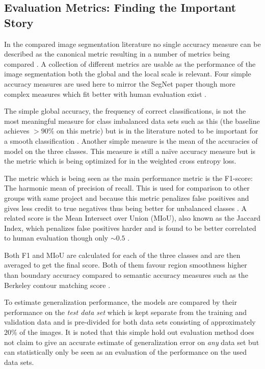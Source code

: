 \documentclass{article}
\begin{document}
\subsection{Evaluation Metrics: Finding the Important Story}
In the compared image segmentation literature no single accuracy measure can be described  as the canonical metric resulting in a number of metrics being compared \cite{eval, Metric}.  A collection of different metrics are usable as the performance of the image segmentation both the global and the local scale is relevant. 
Four simple accuracy measures are used here to mirror the SegNet paper \cite{seg} though more complex measures which fit better with human evaluation exist \cite{eval}. 

The simple global accuracy, the frequency of correct classifications, is not the most meaningful measure for class imbalanced data sets such as this (the baseline achieves \(>90\%\) on this metric) but is in the literature noted to be important for a smooth classification \cite{seg}. Another simple measure is the mean of the accuracies of model on the three classes. This measure is still a naïve accuracy measure but is the metric which is being optimized for in the weighted cross entropy loss. 

The metric which is being seen as the main performance metric is the F1-score: The harmonic mean of precision of recall. This is used for comparison to other groups with same project and because this metric penalizes false positives and gives less credit to true negatives thus being better for unbalanced classes \cite{Metric}. A related score is the Mean Intersect over Union (MIoU), also known as the Jaccard Index, which penalizes false positives harder and is found to be better correlated to human evaluation though only \(\sim 0.5\) \cite{eval}. 

Both F1 and MIoU are calculated for each of the three classes and are then averaged to get the final score. Both of them favour region smoothness higher than boundary accuracy compared to semantic accuracy measures such as the Berkeley contour matching score \cite{seg}.

To estimate generalization performance, the models are compared by their performance on the \textit{test data set} which is kept separate from the training and validation data and is pre-divided for both data sets consisting of approximately \( 20\%\) of the images.  It is noted that this simple hold out evaluation method does not claim to give an accurate estimate of generalization error on \textit{any} data set but can statistically only be seen as an evaluation of the performance on the used data sets. 
\end{document}
